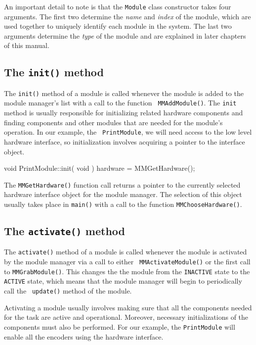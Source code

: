 An important detail to note is that the {\tt Module} class constructor takes
four arguments. The first two determine the {\em name} and {\em index} of
the module, which are used together to uniquely identify each module in the
system. The last two arguments determine the {\em type} of the module and
are explained in later chapters of this manual.

\subsection{The {\tt init()} method}

The {\tt init()} method of a module is called whenever the module is added
to the module manager's list with a call to the function {\tt
MMAddModule()}. The {\tt init} method is usually responsible for
initializing related hardware components and finding components and other
modules that are needed for the module's operation. In our example, the {\tt
PrintModule}, we will need access to the low level hardware interface, so
initialization involves acquiring a pointer to the interface object.

\begin{codesegment}
void PrintModule::init( void ) {
  hardware = MMGetHardware();
}
\end{codesegment}

The {\tt MMGetHardware()} function call returns a pointer to the currently
selected hardware interface object for the module manager. The selection of
this object usually takes place in {\tt main()} with a call to the function
{\tt MMChooseHardware()}.

\subsection{The {\tt activate()} method}

The {\tt activate()} method of a module is called whenever the module is
activated by the module manager via a call to either {\tt
MMActivateModule()} or the first call to {\tt MMGrabModule()}. This changes
the the module from the {\tt INACTIVE} state to the {\tt ACTIVE} state,
which means that the module manager will begin to periodically call the {\tt
update()} method of the module.

Activating a module usually involves making sure that all the components
needed for the task are active and operational. Moreover, necessary
initializations of the components must also be performed. For our example,
the {\tt PrintModule} will enable all the encoders using the hardware
interface.


